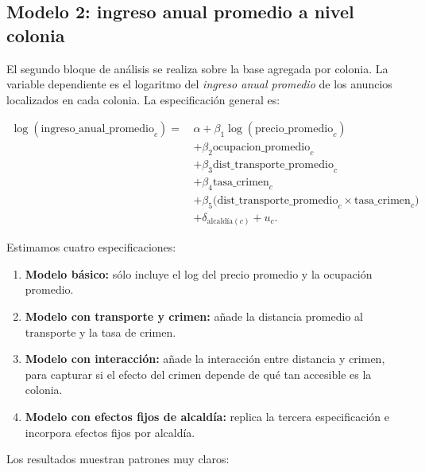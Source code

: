 \documentclass[12pt]{article}
\begin{document}
\subsection{Modelo 2: ingreso anual promedio a nivel colonia}

El segundo bloque de análisis se realiza sobre la base agregada por colonia. La variable dependiente es el logaritmo del \emph{ingreso anual promedio} de los anuncios localizados en cada colonia. La especificación general es:

\begin{align}
\log(\text{ingreso\_anual\_promedio}_c)
=\, & \alpha
+ \beta_1 \log(\text{precio\_promedio}_c) \\
& + \beta_2 \text{ocupacion\_promedio}_c \\
& + \beta_3 \text{dist\_transporte\_promedio}_c \\
& + \beta_4 \text{tasa\_crimen}_c \\
& + \beta_5 \big(\text{dist\_transporte\_promedio}_c 
\times 
\text{tasa\_crimen}_c\big) \\
& + \delta_{\text{alcaldía}(c)}
+ u_c.
\end{align}

Estimamos cuatro especificaciones:

\begin{enumerate}
  \item \textbf{Modelo básico:} sólo incluye el log del precio promedio y la ocupación promedio.
  \item \textbf{Modelo con transporte y crimen:} añade la distancia promedio al transporte y la tasa de crimen.
  \item \textbf{Modelo con interacción:} añade la interacción entre distancia y crimen, para capturar si el efecto del crimen depende de qué tan accesible es la colonia.
  \item \textbf{Modelo con efectos fijos de alcaldía:} replica la tercera especificación e incorpora efectos fijos por alcaldía.
\end{enumerate}

Los resultados muestran patrones muy claros:
\end{document}
